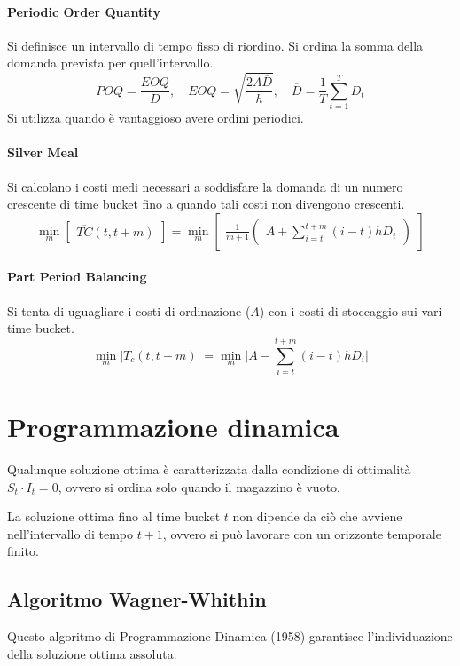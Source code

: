 %
\paragraph{Periodic Order Quantity} Si definisce un intervallo di tempo fisso di riordino. Si ordina la somma della domanda prevista per quell'intervallo.
\[
    POQ = \frac{EOQ}{D}, \quad EOQ = \sqrt{\frac{2A \overline{D}}{h}}, \quad \overline{D} = \frac{1}{T}\sum_{t=1}^{T}D_{t}
\]
Si utilizza quando è vantaggioso avere ordini periodici.

%
\paragraph{Silver Meal} Si calcolano i costi medi necessari a soddisfare la domanda di un numero crescente di time bucket fino a quando tali costi non divengono crescenti.
\[
    \min_{m}
    \begin{bmatrix}
        \overline{TC}(t,t+m)
    \end{bmatrix} =
    \min_{m}
    \begin{bmatrix}
        \frac{1}{m+1} \begin{pmatrix}
                          A + \sum_{i=t}^{t+m}(i-t)hD_{i}
                      \end{pmatrix}
    \end{bmatrix}
\]

%
\paragraph{Part Period Balancing} Si tenta di uguagliare i costi di ordinazione ($A$) con i costi di stoccaggio sui vari time bucket.
\[
    \min_{m}
    \lvert T_{c} (t,t+m) \rvert =
    \min_{m}
    \lvert A - \sum_{i=t}^{t+m}(i-t)hD_{i} \rvert
\]

%
\section{Programmazione dinamica}
Qualunque soluzione ottima è caratterizzata dalla condizione di ottimalità $ S_{t} \cdot I_{t} = 0 $, ovvero si ordina solo quando il magazzino è vuoto.

La soluzione ottima fino al time bucket $ t $ non dipende da ciò che avviene
nell'intervallo di tempo $ t+1 $, ovvero si può lavorare con un orizzonte
temporale finito.
%
\subsection{Algoritmo Wagner-Whithin}
Questo algoritmo di Programmazione Dinamica (1958) garantisce l'individuazione della soluzione ottima assoluta.

